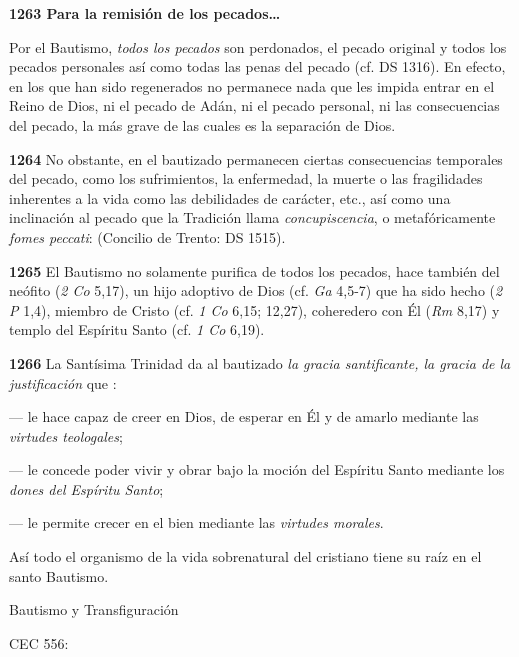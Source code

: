 \begin{body}
\begin{body}
{\textbf{1263 Para la remisión de los pecados\ldots{}}

Por el Bautismo, \emph{todos los pecados} son perdonados, el pecado original y todos los pecados personales así como todas las penas del pecado (cf. DS 1316). En efecto, en los que han sido regenerados no permanece nada que les impida entrar en el Reino de Dios, ni el pecado de Adán, ni el pecado personal, ni las consecuencias del pecado, la más grave de las cuales es la separación de Dios.

\textbf{1264} No obstante, en el bautizado permanecen ciertas consecuencias temporales del pecado, como los sufrimientos, la enfermedad, la muerte o las fragilidades inherentes a la vida como las debilidades de carácter, etc., así como una inclinación al pecado que la Tradición llama \emph{concupiscencia}, o metafóricamente \emph{fomes peccati}:  (Concilio de Trento: DS 1515).

\textbf{}

\textbf{1265} El Bautismo no solamente purifica de todos los pecados, hace también del neófito  (\emph{2 Co} 5,17), un hijo adoptivo de Dios (cf. \emph{Ga} 4,5-7) que ha sido hecho  (\emph{2 P} 1,4), miembro de Cristo (cf. \emph{1 Co} 6,15; 12,27), coheredero con Él (\emph{Rm} 8,17) y templo del Espíritu Santo (cf. \emph{1 Co} 6,19).

\textbf{1266} La Santísima Trinidad da al bautizado \emph{la gracia santificante, la gracia de la justificación} que :

--- le hace capaz de creer en Dios, de esperar en Él y de amarlo mediante las \emph{virtudes teologales};

--- le concede poder vivir y obrar bajo la moción del Espíritu Santo mediante los \emph{dones del Espíritu Santo};

--- le permite crecer en el bien mediante las \emph{virtudes morales}.

Así todo el organismo de la vida sobrenatural del cristiano tiene su raíz en el santo Bautismo.

Bautismo y Transfiguración

CEC 556:

}
\end{body}
\end{body}
